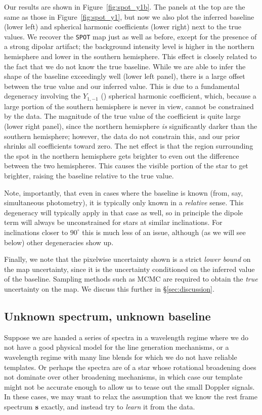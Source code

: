 \documentclass[modern]{aastex62}
\begin{document}
Our results are shown in
Figure~\ref{fig:spot_y1b}. The panels at the top are the same as those
in Figure~\ref{fig:spot_y1}, but now we also plot the inferred baseline
(lower left) and spherical harmonic coefficients (lower right) next to
the true values. We recover the \texttt{SPOT} map just as well as before,
except for the presence of a strong dipolar artifact; the background
intensity level is higher in the northern hemisphere and lower in the
southern hemisphere. This effect is closely related to the fact that
we do not know the true baseline. While we are able to infer the
shape of the baseline exceedingly well (lower left panel), there is a large
offset between the true value and our inferred value. This is due to
a fundamental degeneracy involving the
$Y_{1,-1}$ ()  %
spherical harmonic coefficient, which, because a large portion of the southern
hemisphere is never in view, cannot be constrained by the data. The
magnitude of the true value of the coefficient is quite large (lower right
panel), since the northern hemisphere \emph{is} significantly darker than
the southern hemisphere; however, the data do not constrain this, and
our prior shrinks all coefficients toward zero. The net effect is that the
region surrounding the spot in the northern hemisphere gets brighter to
even out the difference between the two hemispheres. This causes the
visible portion of the star to get brighter, raising the baseline
relative to the true value.

Note, importantly, that even in cases where the baseline is known (from, say,
simultaneous photometry), it is typically only known in a \emph{relative}
sense. This degeneracy will typically apply in that case as well, so in
principle the dipole term will always be unconstrained for stars at
similar inclinations. For inclinations closer to $90^\circ$ this is much
less of an issue, although (as we will see below) other degeneracies show up.

Finally, we note that the pixelwise uncertainty shown is a strict
\emph{lower bound} on the map uncertainty, since it is the uncertainty
conditioned on the inferred value of the baseline. Sampling methods
such as MCMC are required to obtain the \emph{true} uncertainty on the
map. We discuss this further in \S\ref{sec:discussion}.

\subsection{Unknown spectrum, unknown baseline}
\label{sec:spot_y1bs}
%
Suppose we are handed a series of spectra in a wavelength regime where
we do not have a good physical model for the line generation mechanisms,
or a wavelength regime with many line blends for which we do not have
reliable templates. Or perhaps the spectra are of a star whose
rotational broadening does not dominate over other broadening mechanisms,
in which case our template might not be accurate enough to allow us to
tease out the small Doppler signals. In these cases, we may want to relax
the assumption that we know the rest frame spectrum ${\mathbf{s}}$ exactly,
and instead try to \emph{learn} it from the data.
\end{document}
